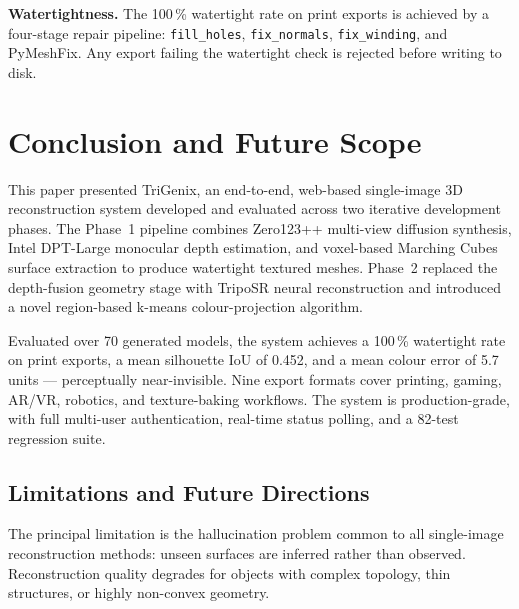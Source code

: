 \documentclass[conference]{IEEEtran}
\begin{document}
\textbf{Watertightness.}
The 100\,\% watertight rate on print exports is achieved by a four-stage repair pipeline: \texttt{fill\_holes},
\texttt{fix\_normals}, \texttt{fix\_winding}, and PyMeshFix. Any export failing the watertight check is rejected
before writing to disk.

\section{Conclusion and Future Scope}

This paper presented TriGenix, an end-to-end, web-based single-image 3D reconstruction system developed and
evaluated across two iterative development phases. The Phase~1 pipeline combines Zero123++ multi-view diffusion
synthesis, Intel DPT-Large monocular depth estimation, and voxel-based Marching Cubes surface extraction to
produce watertight textured meshes. Phase~2 replaced the depth-fusion geometry stage with TripoSR neural
reconstruction and introduced a novel region-based k-means colour-projection algorithm.

Evaluated over 70 generated models, the system achieves a 100\,\% watertight rate on print exports, a mean
silhouette IoU of 0.452, and a mean colour error of 5.7 units — perceptually near-invisible. Nine export
formats cover printing, gaming, AR/VR, robotics, and texture-baking workflows. The system is production-grade,
with full multi-user authentication, real-time status polling, and a 82-test regression suite.



\subsection{Limitations and Future Directions}%

The principal limitation is the hallucination problem common to all single-image reconstruction methods:
unseen surfaces are inferred rather than observed. Reconstruction quality degrades for objects with complex
topology, thin structures, or highly non-convex geometry.
\end{document}
